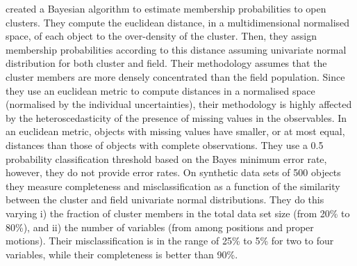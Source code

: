 \citet{Sampedro2016} created a Bayesian algorithm to estimate membership probabilities to open clusters. They compute the euclidean distance, in a multidimensional normalised space, of each object to the over-density of the cluster. Then, they assign membership probabilities according to this distance assuming univariate normal distribution for both cluster and field. Their methodology assumes that the cluster members are more densely concentrated than the field population. Since they use an euclidean metric to compute distances in a normalised space (normalised by the individual uncertainties), their methodology is highly affected by the heteroscedasticity of the presence of missing values in the observables. In an euclidean metric, objects with missing values have smaller, or at most equal, distances than those of objects with complete observations. They use a 0.5 probability classification threshold based on the Bayes minimum error rate, however, they do not provide error rates. On synthetic data sets of 500 objects they measure completeness and misclassification as a function of  the similarity between the cluster and field univariate normal distributions. They do this varying i) the fraction of cluster members in the total data set size (from 20\% to 80\%), and ii) the number of variables (from among positions and proper motions). Their misclassification is in the range of 25\% to 5\% for two to four variables, while their completeness is better than 90\%. 


